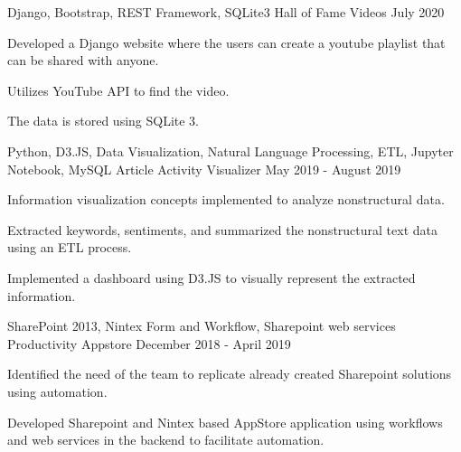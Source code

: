 

\begin{cventries}

  \cventry
    {Django, Bootstrap, REST Framework, SQLite3} %
    {Hall of Fame Videos} %
    {} %
    {July 2020} %
    {
      \begin{cvitems} %
        \item {Developed a Django website where the users can create a youtube playlist that can be shared with anyone.}
        \item {Utilizes YouTube API to find the video.}
        \item {The data is stored using SQLite 3.}
      \end{cvitems}
    }

  \cventry
    {Python, D3.JS, Data Visualization, Natural Language Processing, ETL, Jupyter Notebook, MySQL} %
    {Article Activity Visualizer} %
    {} %
    {May 2019 - August 2019} %
    {
      \begin{cvitems} %
        \item {Information visualization concepts implemented to analyze nonstructural data.}
        \item {Extracted keywords, sentiments, and summarized the nonstructural text data using an ETL process.}
        \item {Implemented a dashboard using D3.JS to visually represent the extracted information.}
      \end{cvitems}
    }

  
  \cventry
    {SharePoint 2013, Nintex Form and Workflow, Sharepoint web services} %
    {Productivity Appstore} %
    {} %
    {December 2018 - April 2019} %
    {
      \begin{cvitems} %
        \item {Identified the need of the team to replicate already created Sharepoint solutions using automation.}
        \item {Developed Sharepoint and Nintex based AppStore application using workflows and web services in the backend to facilitate automation.}
      \end{cvitems}
    }

\end{cventries}
